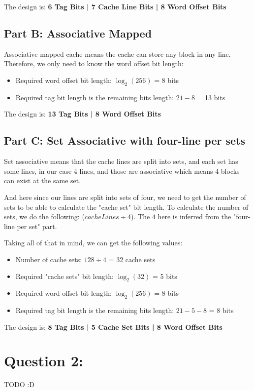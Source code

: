 \documentclass[a4paper]{article}
\begin{document}
The design is: \textbf{6 Tag Bits | 7 Cache Line Bits | 8 Word Offset Bits}

\subsection{Part B: Associative Mapped}

Associative mapped cache means the cache can store any block in any line. Therefore, we only need to know the word offset bit length:

\begin{itemize}
    \item Required word offset bit length: $\log_2(256)$ = 8 bits
    \item Required tag bit length is the remaining bits length: $21 - 8$ = 13 bits
\end{itemize}

The design is: \textbf{13 Tag Bits | 8 Word Offset Bits}

\subsection{Part C: Set Associative with four-line per sets}

Set associative means that the cache lines are split into sets, and each set has some lines, in our case 4 lines, and those are associative which means 4 blocks can exist at the same set.

And here since our lines are split into sets of four, we need to get the number of sets to be able to calculate the "cache set" bit length. To calculate the number of sets, we do the following: ($cacheLines \div 4$). The $4$ here is inferred from the "four-line per set" part.

Taking all of that in mind, we can get the following values:

\begin{itemize}
    \item Number of cache sets: $128 \div 4$ = 32 cache sets
    \item Required "cache sets" bit length: $\log_2(32)$ = 5 bits
    \item Required word offset bit length: $\log_2(256)$ = 8 bits
    \item Required tag bit length is the remaining bits length: $21 - 5 - 8$ = 8 bits
\end{itemize}

The design is: \textbf{8 Tag Bits | 5 Cache Set Bits | 8 Word Offset Bits}

\section{Question 2:}

TODO :D
\end{document}
